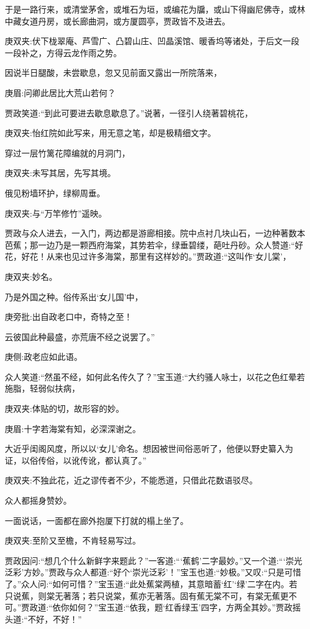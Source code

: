 \begin{parag}
    于是一路行来，或清堂茅舍，或堆石为垣，或编花为牖，或山下得幽尼佛寺，或林中藏女道丹房，或长廊曲洞，或方厦圆亭，贾政皆不及进去。\begin{note}庚双夹:伏下栊翠庵、芦雪广、凸碧山庄、凹晶溪馆、暖香坞等诸处，于后文一段一段补之，方得云龙作雨之势。\end{note}因说半日腿酸，未尝歇息，忽又见前面又露出一所院落来，\begin{note}庚眉:问卿此居比大荒山若何？\end{note}贾政笑道:“到此可要进去歇息歇息了。”说著，一径引人绕著碧桃花，\begin{note}庚双夹:怡红院如此写来，用无意之笔，却是极精细文字。\end{note}穿过一层竹篱花障编就的月洞门，\begin{note}庚双夹:未写其居，先写其境。\end{note}俄见粉墙环护，绿柳周垂。\begin{note}庚双夹:与“万竿修竹”遥映。\end{note}贾政与众人进去，一入门，两边都是游廊相接。院中点衬几块山石，一边种著数本芭蕉；那一边乃是一颗西府海棠，其势若伞，绿垂碧缕，葩吐丹砂。众人赞道:“好花，好花！从来也见过许多海棠，那里有这样妙的。”贾政道:“这叫作‘女儿棠’，\begin{note}庚双夹:妙名。\end{note}乃是外国之种。俗传系出‘女儿国’中，\begin{note}庚旁批:出自政老口中，奇特之至！\end{note}云彼国此种最盛，亦荒唐不经之说罢了。”\begin{note}庚侧:政老应如此语。\end{note}众人笑道:“然虽不经，如何此名传久了？”宝玉道:“大约骚人咏士，以花之色红晕若施脂，轻弱似扶病，\begin{note}庚双夹:体贴的切，故形容的妙。\end{note}\begin{note}庚眉:十字若海棠有知，必深深谢之。\end{note}大近乎闺阁风度，所以以‘女儿’命名。想因被世间俗恶听了，他便以野史纂入为证，以俗传俗，以讹传讹，都认真了。”\begin{note}庚双夹:不独此花，近之谬传者不少，不能悉道，只借此花数语驳尽。\end{note}众人都摇身赞妙。
\end{parag}


\begin{parag}
    一面说话，一面都在廊外抱厦下打就的榻上坐了。\begin{note}庚双夹:至阶又至檐，不肯轻易写过。\end{note}贾政因问:“想几个什么新鲜字来题此？”一客道:“‘蕉鹤’二字最妙。”又一个道:“‘崇光泛彩’方妙。”贾政与众人都道:“好个‘崇光泛彩’！”宝玉也道:“妙极。”又叹:“只是可惜了。”众人问:“如何可惜？”宝玉道:“此处蕉棠两植，其意暗蓄‘红’‘绿’二字在内。若只说蕉，则棠无著落；若只说棠，蕉亦无著落。固有蕉无棠不可，有棠无蕉更不可。”贾政道:“依你如何？”宝玉道:“依我，题‘红香绿玉’四字，方两全其妙。”贾政摇头道:“不好，不好！”
\end{parag}



